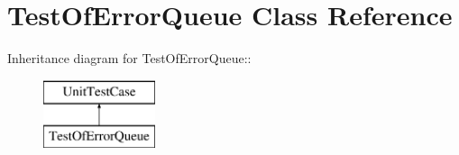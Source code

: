 \hypertarget{class_test_of_error_queue}{
\section{TestOfErrorQueue Class Reference}
\label{class_test_of_error_queue}
}
Inheritance diagram for TestOfErrorQueue::\begin{figure}[H]
\begin{center}
\leavevmode
\includegraphics[height=2cm]{class_test_of_error_queue}
\end{center}
\end{figure}

